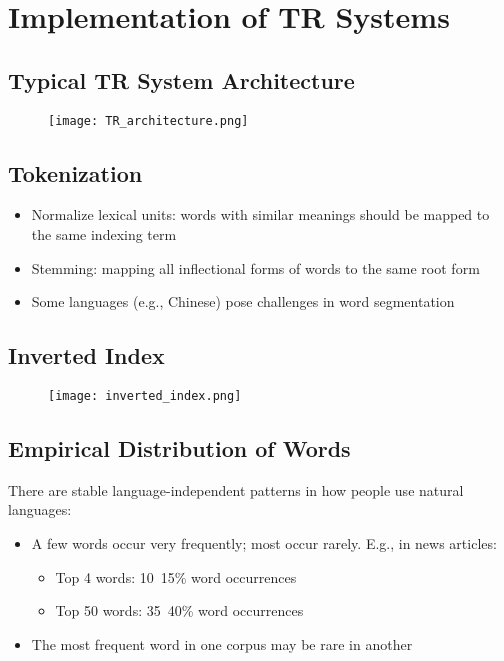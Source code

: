 \section{Implementation of TR Systems}

\subsection{Typical TR System Architecture}
\begin{figure}[H]
    \centering
    \texttt{[image: TR\_architecture.png]}
\end{figure}

\subsection{Tokenization}
\begin{itemize}
\item Normalize lexical units: words with similar meanings should be mapped to the same indexing term
\item Stemming: mapping all inflectional forms of words to the same root form
\item Some languages (e.g., Chinese) pose challenges in word segmentation
\end{itemize}

\subsection{Inverted Index}
\begin{figure}[H]
    \centering
    \texttt{[image: inverted\_index.png]}
\end{figure}


\subsection{Empirical Distribution of Words}
There are stable language-independent patterns in how people use natural languages:
\begin{itemize}
\item A few words occur very frequently; most occur rarely. E.g., in news articles:
\begin{itemize}
\item Top 4 words: 10~15\% word occurrences 
\item Top 50 words: 35~40\% word occurrences
\end{itemize}
\item The most frequent word in one corpus may be rare in another
\end{itemize}


